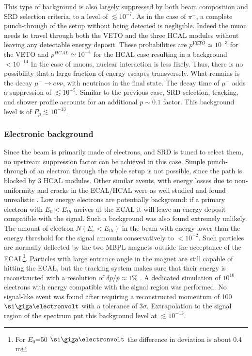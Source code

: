 This type of background is also largely suppressed by both beam composition and SRD selection criteria, to a level of $\lesssim 10^{-7}$. As in the case of $\pi^-$, a complete punch-through of the setup without being detected is negligible. Indeed the muon needs to travel through both the VETO and the three HCAL modules without leaving any detectable energy deposit. These probabilities are $p^{VETO} \simeq 10^{-3}$ for the VETO and $p^{HCAL} \simeq 10^{-4}$ for the HCAL case resulting in a background $< 10^{-14}$
In the case of muons, nuclear interaction is less likely. Thus, there is no possibility that a large fraction of energy escapes transversely. 
What remains is the decay $\mu^- \rightarrow e\nu\nu$, with neutrinos in the final state. The decay time of $\mu^-$ adds a suppression of $\lesssim 10^{-5}$. Similar to the previous case, SRD selection, tracking, and shower profile accounts for an additional $p\sim 0.1$ factor. This background level is of $P_{\mu} \lesssim 10^{-13}$.

\subsubsection{Electronic background}
\label{ch3:sec:bkg:inv:elec}

Since the beam is primarily made of electrons, and SRD is tuned to select them, no upstream suppression factor can be achieved in this case. Simple punch-through of an electron through the whole setup is not possible, since the path is blocked by 3 HCAL modules. Other similar events, with energy losses due to non-uniformity and cracks in the ECAL/HCAL were as well studied and found unrealistic \cite{Andreas:2013lya}. Low energy electrons are potentially background: if a primary electron with $E_0 < E_{th}$ arrives at the ECAL it will leave an energy deposit compatible with the signal. Such a background was also found extremely unlikely. The amount of electron $N(E_e<E_{th})$ in the beam with energy lower than the energy threshold for the signal amounts conservatively to $<10^{-2}$. Such particles are normally deflected by the two MBPL magnets outside the acceptance of the ECAL\footnote{For $E_0$=50 $\gev$ the difference in deviation is about 0.4 \si{\meter}}. Particles with large entrance angle in the magnet are still capable of hitting the ECAL, but the tracking system makes sure that their energy is reconstructed with a resolution of $\delta p/p \approx 1\%$ \cite{Banerjee:2017mdu}. A dedicated simulation of $10^{10}$ electrons with energy compatible with the signal region was performed. No signal-like event was found after requiring a reconstructed momentum of 100 $\gev$ with a tolerance of 3$\sigma$. Extrapolation to the signal region of the spectrum put this background level at $\lesssim 10^{-13}$.


